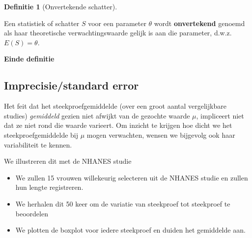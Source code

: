 \documentclass[
  12pt,dutch,coursenotes]{book}
\providecommand{\tightlist}{%
  \setlength{\itemsep}{0pt}\setlength{\parskip}{0pt}}
\theoremstyle{definition}
\newtheorem{definition}{Definitie}[chapter]
\theoremstyle{definition}
\theoremstyle{definition}
\theoremstyle{remark}
\begin{document}
\begin{definition}[Onvertekende schatter]
\protect\hypertarget{def:unnamed-chunk-128}{}{\label{def:unnamed-chunk-128} \iffalse (Onvertekende schatter) \fi{} }
\end{definition}
Een statistiek of schatter \(S\) voor een
parameter \(\theta\) wordt \textbf{onvertekend} genoemd als haar theoretische
verwachtingswaarde gelijk is aan die parameter, d.w.z. \(E(S)= \theta\).

\textbf{Einde definitie}

\hypertarget{imprecisiestandard-error}{%
\subsection{Imprecisie/standard error}\label{imprecisiestandard-error}}

Het feit dat het steekproefgemiddelde (over een groot aantal vergelijkbare studies) \emph{gemiddeld} gezien niet afwijkt van de gezochte waarde \(\mu\), impliceert niet dat ze niet rond die waarde varieert.
Om inzicht te krijgen hoe dicht we het steekproefgemiddelde bij \(\mu\) mogen verwachten, wensen we bijgevolg ook haar variabiliteit te kennen.

We illustreren dit met de NHANES studie

\begin{itemize}
\tightlist
\item
  We zullen 15 vrouwen willekeurig selecteren uit de NHANES studie en zullen hun lengte registreren.
\item
  We herhalen dit 50 keer om de variatie van steekproef tot steekproef te beoordelen
\item
  We plotten de boxplot voor iedere steekproef en duiden het gemiddelde aan.
\end{itemize}
\end{document}

